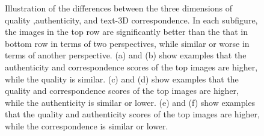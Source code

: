 \begin{figure}[!t]
    \centering
                
                
    \caption{Illustration of the differences between the three dimensions of quality ,authenticity, and text-3D correspondence. In each subfigure, the images in the top row are significantly better than the that in bottom row in terms of two perspectives, while similar or worse in terms of another perspective. (a) and (b) show examples that the authenticity and correspondence scores of the top images are higher, while the quality is similar. (c) and (d) show examples that the quality and correspondence scores of the top images are higher, while the authenticity is similar or lower. (e) and (f) show examples that the quality and authenticity scores of the top images are higher, while the correspondence is similar or lower. }
    \label{fig:xx}
    \vspace{-0.5cm}
\end{figure}
